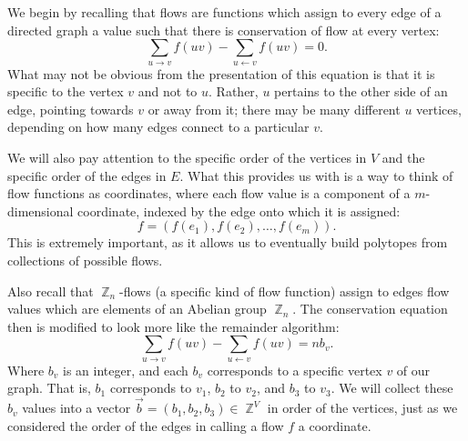 \documentclass{amsart}
\DeclareMathOperator{\Z}{\mathbb{Z}}
\theoremstyle{plain}
\theoremstyle{remark}
\theoremstyle{definition}
\begin{document}

We begin by recalling that flows are functions which assign to every edge of a
directed graph a value such that there is conservation of flow at every vertex:
\[
  \sum_{u\rightarrow v}f(uv)-\sum_{u\leftarrow v}f(uv)=0.
\]
What may not be obvious from the presentation of this equation is that it is
specific to the vertex $v$ and not to $u$. Rather, $u$ pertains to the other
side of an edge, pointing towards $v$ or away from it; there may be many
different $u$ vertices, depending on how many edges connect to a particular $v$.

We will also pay attention to the specific order of the vertices in $V$ and the
specific order of the edges in $E$.
What this provides us with is a way to think of flow functions as coordinates,
where each flow value is a component of a $m$-dimensional coordinate,
indexed by the edge onto which it is assigned:
\[
  f=(f(e_1),f(e_2),\ldots,f(e_m)).
\]
This is extremely important, as it allows us to eventually build polytopes
from collections of possible flows.


Also recall that $\Z_n$-flows (a specific kind of flow function)
assign to edges flow values which are elements of an Abelian group $\Z_n$.
The conservation equation then is modified to look more like the remainder
algorithm:
\begin{equation}
  \sum_{u\rightarrow v}f(uv)-\sum_{u\leftarrow v}f(uv)=nb_v.\label{eqn:flow_conservation}
\end{equation}
Where $b_v$ is an integer, and each $b_v$ corresponds to a specific vertex $v$
of our graph. That is, $b_1$ corresponds to $v_1$, $b_2$ to $v_2$,
and $b_3$ to $v_3$.
We will collect these $b_v$ values into a vector $\vec b=(b_1,b_2,b_3)\in \Z^V$
in order of the vertices,
just as we considered the order of the edges in calling a flow $f$ a
coordinate.
\end{document}
